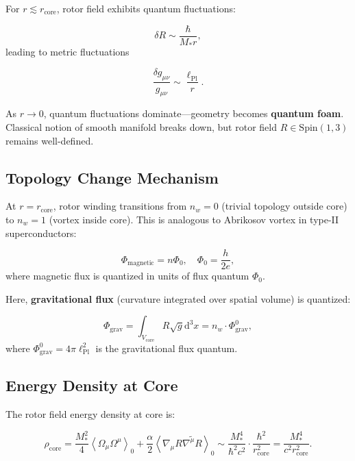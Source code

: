 \documentclass[11pt,a4paper]{article}
\numberwithin{equation}{section}
\theoremstyle{plain}
\theoremstyle{definition}
\theoremstyle{remark}
\newcommand{\grade}[2]{\left\langle #1 \right\rangle_{#2}}
\newcommand{\scal}[1]{\grade{#1}{0}}       %
\newcommand{\rev}[1]{\widetilde{#1}}       %
\newcommand{\Spin}{\mathrm{Spin}}
\renewcommand{\dd}{\mathrm{d}}
\begin{document}
For $r \lesssim r_{\text{core}}$, rotor field exhibits quantum fluctuations:

\begin{equation}
\delta R \sim \frac{\hbar}{M_* r},
\end{equation}
leading to metric fluctuations

\begin{equation}
\frac{\delta g_{\mu\nu}}{g_{\mu\nu}} \sim \frac{\ell_{\text{Pl}}}{r}.
\label{eq:metric-fluctuations}
\end{equation}

As $r \to 0$, quantum fluctuations dominate—geometry becomes \textbf{quantum foam}. Classical notion of smooth manifold breaks down, but rotor field $R \in \Spin(1,3)$ remains well-defined.

\subsection{Topology Change Mechanism}

At $r = r_{\text{core}}$, rotor winding transitions from $n_w = 0$ (trivial topology outside core) to $n_w = 1$ (vortex inside core). This is analogous to Abrikosov vortex in type-II superconductors:

\begin{equation}
\Phi_{\text{magnetic}} = n \Phi_0, \quad \Phi_0 = \frac{h}{2e},
\end{equation}
where magnetic flux is quantized in units of flux quantum $\Phi_0$.

Here, \textbf{gravitational flux} (curvature integrated over spatial volume) is quantized:

\begin{equation}
\Phi_{\text{grav}} = \int_{V_{\text{core}}} R \sqrt{g} \dd^3x = n_w \cdot \Phi_{\text{grav}}^0,
\end{equation}
where $\Phi_{\text{grav}}^0 = 4\pi \ell_{\text{Pl}}^2$ is the gravitational flux quantum.

\subsection{Energy Density at Core}

The rotor field energy density at core is:

\begin{equation}
\rho_{\text{core}} = \frac{M_*^2}{4}\scal{\Omega_\mu \Omega^\mu} + \frac{\alpha}{2}\scal{\nabla_\mu R \rev{\nabla^\mu R}} \sim \frac{M_*^4}{\hbar^2 c^2} \cdot \frac{\hbar^2}{r_{\text{core}}^2} = \frac{M_*^4}{c^2 r_{\text{core}}^2}.
\end{equation}
\end{document}
